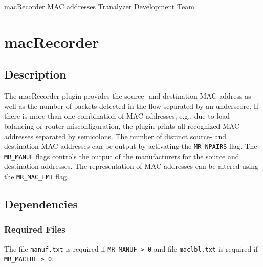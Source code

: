\documentclass[documentation]{subfiles}
\begin{document}
\trantitle
    {macRecorder}
    {MAC addresses}
    {Tranalyzer Development Team} %

\section{macRecorder}\label{s:macRecorder}

\subsection{Description}
The macRecorder plugin provides the source- and destination MAC address as well as the number of packets detected in the flow separated by an underscore. If there is more than one combination of MAC addresses, e.g., due to load balancing or router misconfiguration, the plugin prints all recognized MAC addresses separated by semicolons. The number of distinct source- and destination MAC addresses can be output by activating the {\tt MR\_NPAIRS} flag. The {\tt MR\_MANUF} flags controls the output of the manufacturers for the source and destination addresses. The representation of MAC addresses can be altered using the {\tt MR\_MAC\_FMT} flag.

\subsection{Dependencies}

\subsubsection{Required Files}
The file {\tt manuf.txt} is required if {\tt MR\_MANUF > 0} and file {\tt maclbl.txt} is required if {\tt MR\_MACLBL > 0}.
\end{document}
